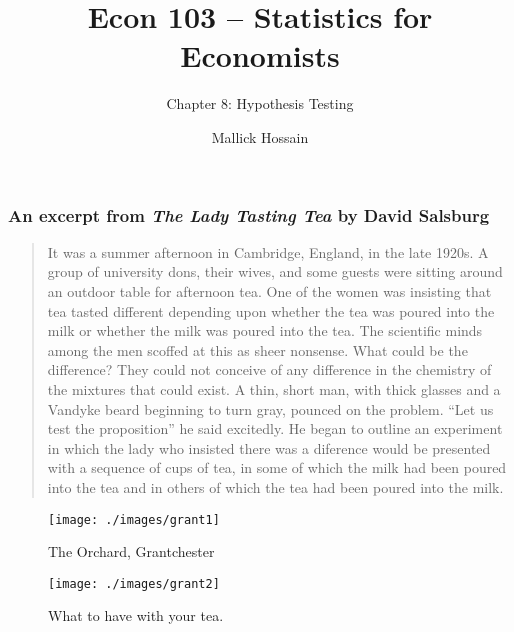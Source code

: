 \documentclass{beamer}
\title{Econ 103 -- Statistics for Economists}
\subtitle{Chapter 8: Hypothesis Testing}
\author{Mallick Hossain}
\date{}
\institute{University of Pennsylvania}
\begin{document}
 

\begin{frame}
	\titlepage 
\end{frame} 

\begin{frame}
\frametitle{An excerpt from \emph{The Lady Tasting Tea} by David Salsburg}
\footnotesize
\begin{quote}
It was a summer afternoon in Cambridge, England, in the late 1920s. A group of university dons, their wives, and some guests were sitting around an outdoor table for afternoon tea. One of the women was insisting that tea tasted different depending upon whether the tea was poured into the milk or whether the milk was poured into the tea. The scientific minds among the men scoffed at this as sheer nonsense. What could be the difference? They could not conceive of any difference in the chemistry of the mixtures that could exist. A thin, short man, with thick glasses and a Vandyke beard beginning to turn gray, pounced on the problem. ``Let us test the proposition'' he said excitedly. He began to outline an experiment in which the lady who insisted there was a diference would be presented with a sequence of cups of tea, in some of which the milk had been poured into the tea and in others of which the tea had been poured into the milk.
\end{quote}
\end{frame}
 \begin{frame}

 \begin{figure}
 \texttt{[image: ./images/grant1]}

\caption{The Orchard, Grantchester}
 \end{figure}

\end{frame}

 \begin{frame}

\begin{figure}
 \texttt{[image: ./images/grant2]}

\caption{What to have with your tea.}
 \end{figure}

\end{frame}

\end{document}
